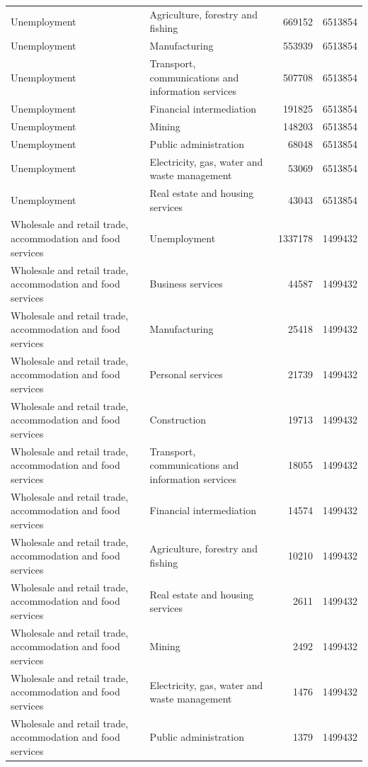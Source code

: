 \begin{longtable}{llrr}
Unemployment & Agriculture, forestry and fishing & 669152 & 6513854 \\
Unemployment & Manufacturing & 553939 & 6513854 \\
Unemployment & Transport, communications and information services & 507708 & 6513854 \\
Unemployment & Financial intermediation & 191825 & 6513854 \\
Unemployment & Mining & 148203 & 6513854 \\
Unemployment & Public administration & 68048 & 6513854 \\
Unemployment & Electricity, gas, water and waste management & 53069 & 6513854 \\
Unemployment & Real estate and housing services & 43043 & 6513854 \\
Wholesale and retail trade, accommodation and food services & Unemployment & 1337178 & 1499432 \\
Wholesale and retail trade, accommodation and food services & Business services & 44587 & 1499432 \\
Wholesale and retail trade, accommodation and food services & Manufacturing & 25418 & 1499432 \\
Wholesale and retail trade, accommodation and food services & Personal services & 21739 & 1499432 \\
Wholesale and retail trade, accommodation and food services & Construction & 19713 & 1499432 \\
Wholesale and retail trade, accommodation and food services & Transport, communications and information services & 18055 & 1499432 \\
Wholesale and retail trade, accommodation and food services & Financial intermediation & 14574 & 1499432 \\
Wholesale and retail trade, accommodation and food services & Agriculture, forestry and fishing & 10210 & 1499432 \\
Wholesale and retail trade, accommodation and food services & Real estate and housing services & 2611 & 1499432 \\
Wholesale and retail trade, accommodation and food services & Mining & 2492 & 1499432 \\
Wholesale and retail trade, accommodation and food services & Electricity, gas, water and waste management & 1476 & 1499432 \\
Wholesale and retail trade, accommodation and food services & Public administration & 1379 & 1499432 \\
\end{longtable}
